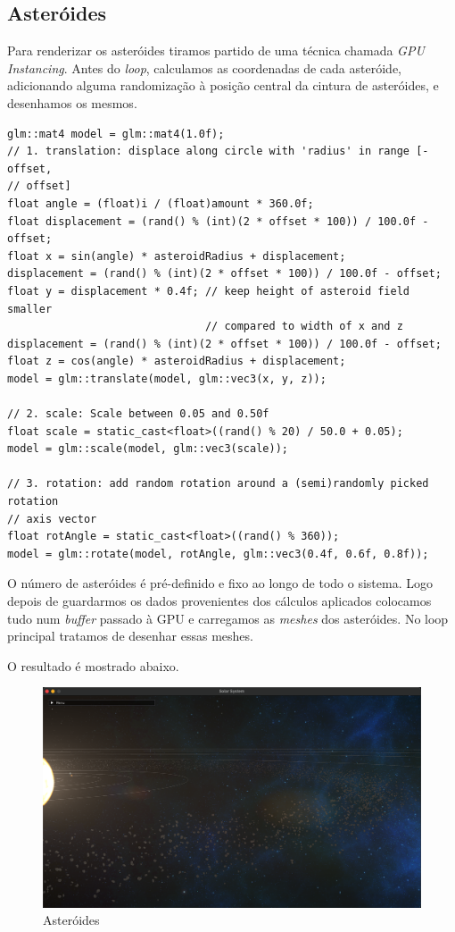 \subsection{Asteróides}
\label{chap2:sec:asteroides}

\noindent
Para renderizar os asteróides tiramos partido de uma técnica chamada \textit{GPU Instancing}. Antes do \textit{loop}, calculamos as coordenadas de cada asteróide, adicionando alguma randomização à posição central da cintura de asteróides, e desenhamos os mesmos. 

\begin{lstlisting}[style=Cpp, caption=Colisões parte 2]
glm::mat4 model = glm::mat4(1.0f);
// 1. translation: displace along circle with 'radius' in range [-offset,
// offset]
float angle = (float)i / (float)amount * 360.0f;
float displacement = (rand() % (int)(2 * offset * 100)) / 100.0f - offset;
float x = sin(angle) * asteroidRadius + displacement;
displacement = (rand() % (int)(2 * offset * 100)) / 100.0f - offset;
float y = displacement * 0.4f; // keep height of asteroid field smaller
                               // compared to width of x and z
displacement = (rand() % (int)(2 * offset * 100)) / 100.0f - offset;
float z = cos(angle) * asteroidRadius + displacement;
model = glm::translate(model, glm::vec3(x, y, z));

// 2. scale: Scale between 0.05 and 0.50f
float scale = static_cast<float>((rand() % 20) / 50.0 + 0.05);
model = glm::scale(model, glm::vec3(scale));

// 3. rotation: add random rotation around a (semi)randomly picked rotation
// axis vector
float rotAngle = static_cast<float>((rand() % 360));
model = glm::rotate(model, rotAngle, glm::vec3(0.4f, 0.6f, 0.8f));
\end{lstlisting}

\noindent
O número de asteróides é pré-definido e fixo ao longo de todo o sistema. Logo depois de guardarmos os dados provenientes dos cálculos aplicados colocamos tudo num \textit{buffer} passado à \ac{GPU} e carregamos as \textit{meshes} dos asteróides. No loop principal tratamos de desenhar essas meshes.

\noindent
O resultado é mostrado abaixo.

\enlargethispage{1in}
\thispagestyle{empty}
\begin{figure}[h]
\centering
\includegraphics[width=400pt]{asteroides.png}
\caption{Asteróides}
\end{figure}


